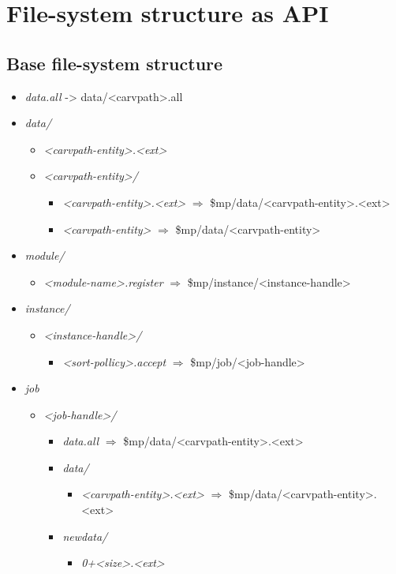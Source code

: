 \chapter{File-system structure as API}
\section{Base file-system structure} 
\begin{itemize}
  \item \emph{data.all} -> data/<carvpath>.all 
  \item \emph{data/} 
  \begin{itemize}
    \item \emph{<carvpath-entity>.<ext>} 
    \item \emph{<carvpath-entity>/} 
    \begin{itemize}
      \item \emph{<carvpath-entity>.<ext>} $\Longrightarrow$ \$mp/data/<carvpath-entity>.<ext>
      \item \emph{<carvpath-entity>} $\Longrightarrow$ \$mp/data/<carvpath-entity>
    \end{itemize}
  \end{itemize}
  \item \emph{module/}
  \begin{itemize}
    \item \emph{<module-name>.register} $\Longrightarrow$ \$mp/instance/<instance-handle>
  \end{itemize}
  \item \emph{instance/}
  \begin{itemize}
    \item \emph{<instance-handle>/}
    \begin{itemize}
      \item \emph{<sort-pollicy>.accept} $\Longrightarrow$ \$mp/job/<job-handle>
    \end{itemize}
  \end{itemize}
  \item \emph{job}
  \begin{itemize}
    \item \emph{<job-handle>/}
    \begin{itemize}
      \item \emph{data.all} $\Longrightarrow$ \$mp/data/<carvpath-entity>.<ext>
      \item \emph{data/}
      \begin{itemize}
        \item \emph{<carvpath-entity>.<ext>} $\Longrightarrow$ \$mp/data/<carvpath-entity>.<ext>
      \end{itemize}
      \item \emph{newdata/}
      \begin{itemize}
        \item \emph{0+<size>.<ext>}
      \end{itemize}
    \end{itemize}
  \end{itemize}
\end{itemize}
